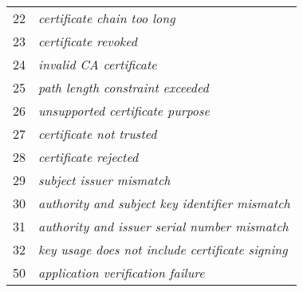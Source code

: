 \begin{anexosenv}
\begin{table}
\begin{longtable}{c>{\em}l}
		\rowcolor[gray]{0.9}
		22 & certificate chain too long \\ 
		23 & certificate revoked \\ 
		\rowcolor[gray]{0.9}
		24 & invalid CA certificate \\ 
		25 & path length constraint exceeded \\ 
		\rowcolor[gray]{0.9}
		26 & unsupported certificate purpose \\ 
		27 & certificate not trusted \\ 
		\rowcolor[gray]{0.9}
		28 & certificate rejected \\ 
		29 & subject issuer mismatch \\ 
		\rowcolor[gray]{0.9}
		30 & authority and subject key identifier mismatch \\ 
		31 & authority and issuer serial number mismatch \\ 
		\rowcolor[gray]{0.9}
		32 & key usage does not include certificate signing \\ 
		50 & application verification failure \\ 
		\bottomrule
		\end{longtable}
	\end{table}


\end{anexosenv}